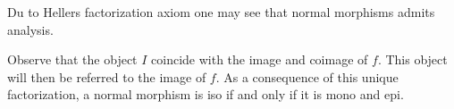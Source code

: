    \begin{remark}
        Du to Hellers factorization axiom one may see that normal morphisms admits analysis.

        \begin{center}
        \end{center}

        Observe that the object $I$ coincide with the image and coimage of $f$. This object will then be referred to the image of $f$. As a consequence of this unique factorization, a normal morphism is iso if and only if it is mono and epi.
    \end{remark}

